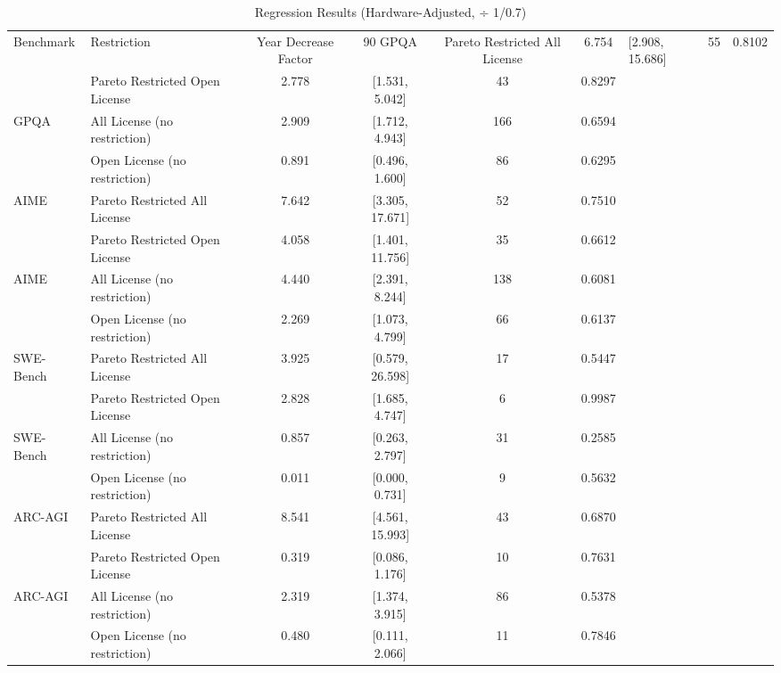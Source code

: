 \begin{table}
\centering
\caption{Regression Results (Hardware-Adjusted, ÷ 1/0.7)}
\label{tab:regression_results_hw_adjusted}
\begin{tabular}{|l|l|c|c|c|c|}
\hline
Benchmark & Restriction & Year Decrease Factor & 90%
\hline
GPQA & Pareto Restricted All License & 6.754 & [2.908, 15.686] & 55 & 0.8102 \\
 & Pareto Restricted Open License & 2.778 & [1.531, 5.042] & 43 & 0.8297 \\
GPQA & All License (no restriction) & 2.909 & [1.712, 4.943] & 166 & 0.6594 \\
 & Open License (no restriction) & 0.891 & [0.496, 1.600] & 86 & 0.6295 \\
AIME & Pareto Restricted All License & 7.642 & [3.305, 17.671] & 52 & 0.7510 \\
 & Pareto Restricted Open License & 4.058 & [1.401, 11.756] & 35 & 0.6612 \\
AIME & All License (no restriction) & 4.440 & [2.391, 8.244] & 138 & 0.6081 \\
 & Open License (no restriction) & 2.269 & [1.073, 4.799] & 66 & 0.6137 \\
SWE-Bench & Pareto Restricted All License & 3.925 & [0.579, 26.598] & 17 & 0.5447 \\
 & Pareto Restricted Open License & 2.828 & [1.685, 4.747] & 6 & 0.9987 \\
SWE-Bench & All License (no restriction) & 0.857 & [0.263, 2.797] & 31 & 0.2585 \\
 & Open License (no restriction) & 0.011 & [0.000, 0.731] & 9 & 0.5632 \\
ARC-AGI & Pareto Restricted All License & 8.541 & [4.561, 15.993] & 43 & 0.6870 \\
 & Pareto Restricted Open License & 0.319 & [0.086, 1.176] & 10 & 0.7631 \\
ARC-AGI & All License (no restriction) & 2.319 & [1.374, 3.915] & 86 & 0.5378 \\
 & Open License (no restriction) & 0.480 & [0.111, 2.066] & 11 & 0.7846 \\
\hline
\end{tabular}
\end{table}